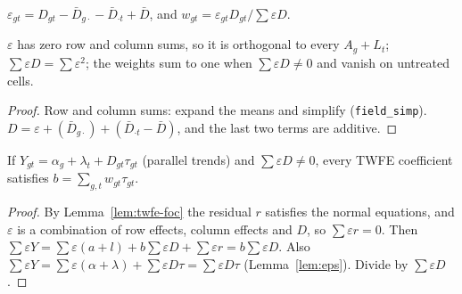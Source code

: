 \begin{definition}
\label{def:twfe-weights}
\leanok
$\varepsilon_{gt} = D_{gt} - \bar D_{g\cdot} - \bar D_{\cdot t} + \bar D$, and $w_{gt} = \varepsilon_{gt}D_{gt}/\sum\varepsilon D$.
\end{definition}

\begin{lemma}
\label{lem:eps}
\leanok
{}
$\varepsilon$ has zero row and column sums, so it is orthogonal to every $A_g + L_t$; $\sum\varepsilon D = \sum\varepsilon^2$;
the weights sum to one when $\sum\varepsilon D \neq 0$ and vanish on untreated cells.
\end{lemma}
\begin{proof}
\leanok
Row and column sums: expand the means and simplify (\texttt{field\_simp}). $D = \varepsilon + (\bar D_{g\cdot}) +
(\bar D_{\cdot t} - \bar D)$, and the last two terms are additive.
\end{proof}

\begin{theorem}
\label{thm:twfe}
\leanok
{}
If $Y_{gt} = \alpha_g + \lambda_t + D_{gt}\tau_{gt}$ (parallel trends) and $\sum\varepsilon D \ne 0$, every TWFE coefficient
satisfies $b = \sum_{g,t} w_{gt}\tau_{gt}$.
\end{theorem}
\begin{proof}
\leanok
{}
By Lemma~\ref{lem:twfe-foc} the residual $r$ satisfies the normal equations, and $\varepsilon$ is a combination of row
effects, column effects and $D$, so $\sum\varepsilon r = 0$. Then $\sum\varepsilon Y = \sum\varepsilon(a+l) + b\sum\varepsilon D
+ \sum\varepsilon r = b\sum\varepsilon D$. Also $\sum\varepsilon Y = \sum\varepsilon(\alpha+\lambda) + \sum\varepsilon D\tau =
\sum\varepsilon D\tau$ (Lemma~\ref{lem:eps}). Divide by $\sum\varepsilon D$.
\end{proof}

